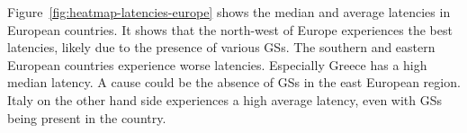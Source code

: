 Figure~\ref{fig:heatmap-latencies-europe} shows the median and average
latencies in European countries. It shows that the north-west of Europe
experiences the best latencies, likely due to the presence of various \ac{GS}s.
The southern and eastern European countries experience worse latencies.
Especially Greece has a high median latency. A cause could be the absence of
\ac{GS}s in the east European region. Italy on the other hand side experiences
a high average latency, even with \ac{GS}s being present in the country.

